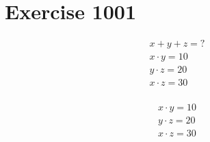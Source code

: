 \documentclass{article}
\begin{document}


\section{Exercise 1001}

\begin{align*}
	x + y + z = ?  \\
	x \cdot y = 10 \\
	y \cdot z = 20 \\
	x \cdot z = 30 \\
\end{align*}

\begin{align*}
	x \cdot y = 10 \\
	y \cdot z = 20 \\
	x \cdot z = 30 \\
\end{align*}

\end{document}
